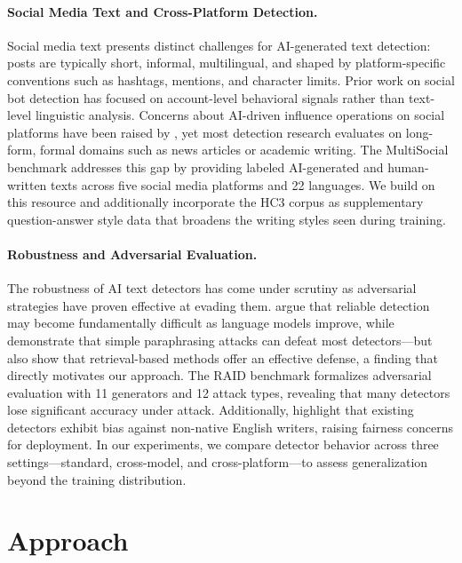 \documentclass[letterpaper]{article} %
\begin{document}
\paragraph{Social Media Text and Cross-Platform Detection.}
Social media text presents distinct challenges for AI-generated text detection: posts are typically short, informal, multilingual, and shaped by platform-specific conventions such as hashtags, mentions, and character limits. Prior work on social bot detection \cite{cresci2020} has focused on account-level behavioral signals rather than text-level linguistic analysis. Concerns about AI-driven influence operations on social platforms have been raised by \citet{goldstein2023}, yet most detection research evaluates on long-form, formal domains such as news articles or academic writing. The MultiSocial benchmark \cite{multisocial2025} addresses this gap by providing labeled AI-generated and human-written texts across five social media platforms and 22 languages. We build on this resource and additionally incorporate the HC3 corpus \cite{guo2023hc3} as supplementary question-answer style data that broadens the writing styles seen during training.

\paragraph{Robustness and Adversarial Evaluation.}
The robustness of AI text detectors has come under scrutiny as adversarial strategies have proven effective at evading them. \citet{sadasivan2023} argue that reliable detection may become fundamentally difficult as language models improve, while \citet{krishna2023paraphrase} demonstrate that simple paraphrasing attacks can defeat most detectors---but also show that retrieval-based methods offer an effective defense, a finding that directly motivates our approach. The RAID benchmark \cite{dugan2024raid} formalizes adversarial evaluation with 11 generators and 12 attack types, revealing that many detectors lose significant accuracy under attack. Additionally, \citet{liang2023bias} highlight that existing detectors exhibit bias against non-native English writers, raising fairness concerns for deployment. In our experiments, we compare detector behavior across three settings---standard, cross-model, and cross-platform---to assess generalization beyond the training distribution.

\section{Approach}
\end{document}

